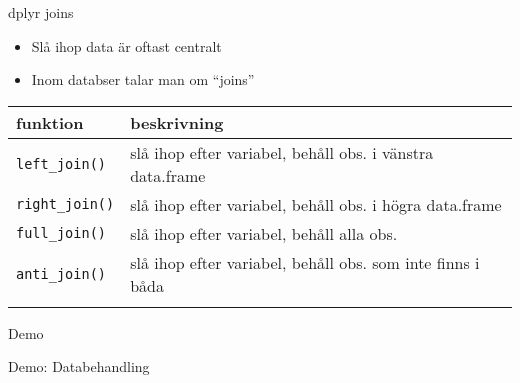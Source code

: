 \documentclass[
  10pt,
  ignorenonframetext,
  handout]{beamer}
\providecommand{\tightlist}{%
  \setlength{\itemsep}{0pt}\setlength{\parskip}{0pt}}
\begin{document}
\begin{frame}[fragile]{dplyr joins}
\label{dplyr-joins}
\begin{itemize}
\tightlist
\item
  Slå ihop data är oftast centralt
\item
  Inom databser talar man om ``joins''
\end{itemize}

\begin{longtable}[]{@{}
  >{\raggedright\arraybackslash}p{}
  >{\raggedright\arraybackslash}p{}@{}}
\toprule\noalign{}
\begin{minipage}[b]{\linewidth}\raggedright
funktion
\end{minipage} & \begin{minipage}[b]{\linewidth}\raggedright
beskrivning
\end{minipage} \\
\midrule\noalign{}
\endhead
\texttt{left\_join()} & slå ihop efter variabel, behåll obs. i vänstra
data.frame \\
\texttt{right\_join()} & slå ihop efter variabel, behåll obs. i högra
data.frame \\
\texttt{full\_join()} & slå ihop efter variabel, behåll alla obs. \\
\texttt{anti\_join()} & slå ihop efter variabel, behåll obs. som inte
finns i båda \\
\bottomrule\noalign{}
\end{longtable}
\end{frame}

\begin{frame}{Demo}
\label{demo-2}
\begin{block}{Demo: Databehandling}
\label{demo-databehandling}
\end{block}
\end{frame}
\end{document}
